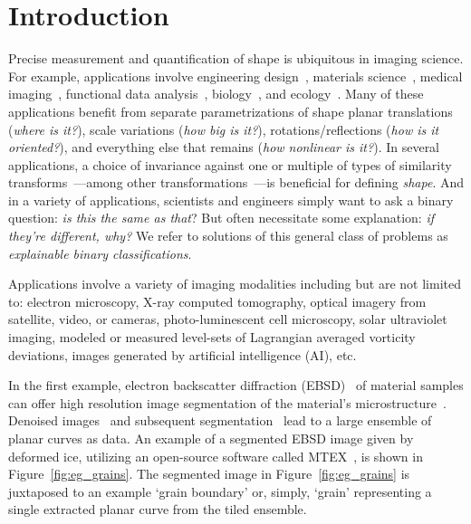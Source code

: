 \documentclass[pdflatex,iicol]{sn-jnl}%
\theoremstyle{thmstyleone}%
\theoremstyle{thmstyletwo}%
\theoremstyle{thmstylethree}%
\begin{document}



\maketitle

\section{Introduction}
\label{sec:intro}

Precise measurement and quantification of shape is ubiquitous in imaging science. For example, applications involve engineering design~\cite{Grey2017,Doronina2023}, materials science~\cite{atindama2023restoration,bachmann2010inferential,Fan2020,FAN2021116810}, medical imaging~\cite{mang2019claire,durrleman2014morphometry}, functional data analysis~\cite{tucker2013generative, srivastava2016functional}, biology~\cite{hartman2023elastic,srivastava2010shape,hagwood2013testing}, and ecology~\cite{lynch2023satellite,gonccalves2021fine}. Many of these applications benefit from separate parametrizations of shape planar translations (\emph{where is it?}), scale variations (\emph{how big is it?}), rotations/reflections (\emph{how is it oriented?}), and everything else that remains (\emph{how nonlinear is it?}). In several applications, a choice of invariance against one or multiple of types of similarity transforms~\cite{kendall2009shape}---among other transformations~\cite{bauer2014overview}---is beneficial for defining \emph{shape}. And in a variety of applications, scientists and engineers simply want to ask a binary question: \emph{is this the same as that}? But often necessitate some explanation: \emph{if they're different, why?} We refer to solutions of this general class of problems as \emph{explainable binary classifications}.

Applications involve a variety of imaging modalities including but are not limited to: electron microscopy, X-ray computed tomography, optical imagery from satellite, video, or cameras, photo-luminescent cell microscopy, solar ultraviolet imaging, modeled or measured level-sets of Lagrangian averaged vorticity deviations, images generated by artificial intelligence (AI), etc. 

In the first example, electron backscatter diffraction (EBSD)~\cite{schwartz2009electron} of material samples can offer high resolution image segmentation of the material's microstructure~\cite{SAVILLE2021102118,stoudt2020location}. Denoised images~\cite{atindama2023restoration} and subsequent segmentation~\cite{bachmann2010texture,FAN2021116810} lead to a large ensemble of planar curves as data. An example of a segmented EBSD image given by deformed ice, utilizing an open-source software called MTEX~\cite{Hielscher:cg5083,Fan2020,FAN2021116810}, is shown in Figure~\ref{fig:eg_grains}. The segmented image in Figure~\ref{fig:eg_grains} is juxtaposed to an example `grain boundary' or, simply, `grain' representing a single extracted planar curve from the tiled ensemble. 
\end{document}
